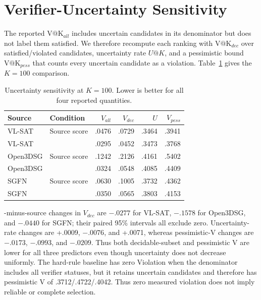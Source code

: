 \section{Verifier-Uncertainty Sensitivity}

The reported $\mathrm{V@K}_{all}$ includes uncertain candidates in its denominator but
does not label them satisfied. We therefore recompute each ranking with
$\mathrm{V@K}_{dec}$ over satisfied/violated candidates, uncertainty rate $U@K$, and
a pessimistic bound $\mathrm{V@K}_{pess}$ that counts every uncertain candidate as a
violation. Table~\ref{tab:uncertainty-sensitivity} gives the $K=100$
comparison.

\begin{table}[t]
\centering
{\small
\setlength{\tabcolsep}{3.5pt}
\begin{tabular}{llrrrr}
\toprule
Source & Condition & $V_{all}$ & $V_{dec}$ & $U$ & $V_{pess}$ \\
\midrule
VL-SAT & Source score & .0476 & .0729 & .3464 & .3941 \\
VL-SAT & \method{} & .0295 & .0452 & .3473 & .3768 \\
\midrule
Open3DSG & Source score & .1242 & .2126 & .4161 & .5402 \\
Open3DSG & \method{} & .0324 & .0548 & .4085 & .4409 \\
\midrule
SGFN & Source score & .0630 & .1005 & .3732 & .4362 \\
SGFN & \method{} & .0350 & .0565 & .3803 & .4153 \\
\bottomrule
\end{tabular}
}
\caption{Uncertainty sensitivity at $K=100$. Lower is better for all four
reported quantities.}
\label{tab:uncertainty-sensitivity}
\end{table}

\method{}-minus-source changes in $V_{dec}$ are $-.0277$ for VL-SAT, $-.1578$
for Open3DSG, and $-.0440$ for SGFN; their paired 95\% intervals all exclude
zero. Uncertainty-rate changes are +.0009, $-.0076$, and +.0071, whereas
pessimistic-V changes are $-.0173$, $-.0993$, and $-.0209$. Thus both
decidable-subset and pessimistic V are lower for all three predictors even though
uncertainty does not decrease uniformly.
The hard-rule baseline has zero Violation when the denominator includes all
verifier statuses, but it retains uncertain candidates and therefore has pessimistic
V of .3712/.4722/.4042. Thus zero measured violation
does not imply reliable or complete selection.
